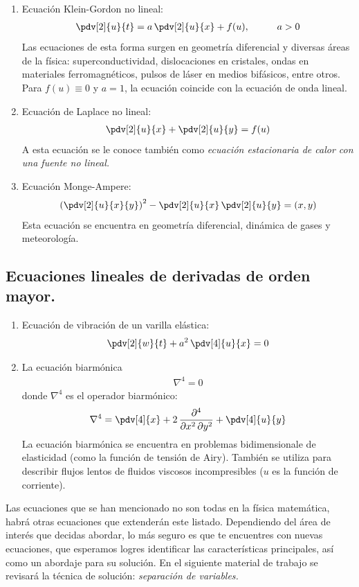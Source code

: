 \begin{enumerate}
\item Ecuación Klein-Gordon no lineal:
\begin{align}
\pdv[2]{u}{t} = a \, \pdv[2]{u}{x} + f(u),\hspace{1cm} a > 0
\label{eq:ecuacion_S31}
\end{align}
Las ecuaciones de esta forma surgen en geometría diferencial y diversas áreas de la física: superconductividad, dislocaciones en cristales, ondas en materiales ferromagnéticos, pulsos de láser en medios bifásicos, entre otros. Para $f (u) \equiv 0$ y $a = 1$, la ecuación coincide con la ecuación de onda lineal.
\item Ecuación de Laplace no lineal:
\begin{align}
\pdv[2]{u}{x} + \pdv[2]{u}{y} = f(u)
\label{eq:ecuacion_S32}
\end{align}
A esta ecuación se le conoce también como \emph{ecuación estacionaria de calor con una fuente no lineal.}
\item Ecuación Monge-Ampere:
\begin{align}
\left( \pdv[2]{u}{x}{y} \right)^{2} - \pdv[2]{u}{x} \, \pdv[2]{u}{y} = (x, y)
\label{eq:ecuacion_S33}
\end{align}
Esta ecuación se encuentra en geometría diferencial, dinámica de gases y meteorología.
\end{enumerate}

\subsection{Ecuaciones lineales de derivadas de orden mayor.}

\begin{enumerate}
\item Ecuación de vibración de un varilla elástica:
\begin{align*}
\pdv[2]{w}{t} + a^{2} \, \pdv[4]{u}{x} = 0
\end{align*}
\item La ecuación biarmónica
\begin{align*}
\nabla^{4} = 0
\end{align*}
donde $\nabla^{4}$ es el operador biarmónico:
\begin{align*}
\nabla^{4} = \pdv[4]{x} + 2 \, \dfrac{\partial^{4}}{\partial x^{2} \, \partial y^{2}} + \pdv[4]{u}{y}
\end{align*}
La ecuación biarmónica se encuentra en problemas bidimensionale de elasticidad (como la función de tensión de Airy). También se utiliza para describir flujos lentos de fluidos viscosos incompresibles ($u$ es la función de corriente).
\end{enumerate}
Las ecuaciones que se han mencionado no son todas en la física matemática, habrá otras ecuaciones que extenderán este listado. Dependiendo del área de interés que decidas abordar, lo más seguro es que te encuentres con nuevas ecuaciones, que esperamos logres identificar las características principales, así como un abordaje para su solución. En el siguiente material de trabajo se revisará la técnica de solución: \emph{separación de variables.}

